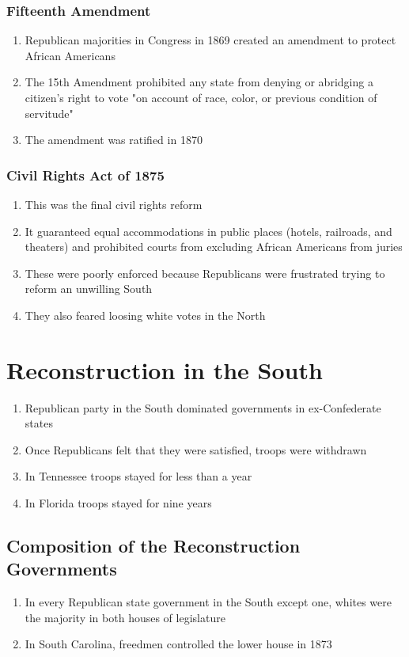 \documentclass[12pt]{article} %
\begin{document}
\subsubsection{Fifteenth Amendment}
\begin{enumerate}
	\item Republican majorities in Congress in 1869 created an amendment to protect African Americans
	\item The 15th Amendment prohibited any state from denying or abridging a citizen's right to 
		vote "on account of race, color, or previous condition of servitude"
	\item The amendment was ratified in 1870
\end{enumerate}

\subsubsection{Civil Rights Act of 1875}
\begin{enumerate}
	\item This was the final civil rights reform
	\item It guaranteed equal accommodations in public places (hotels, railroads, and theaters) and
		prohibited courts from excluding African Americans from juries
	\item These were poorly enforced because Republicans were frustrated trying to reform an unwilling
		South
	\item They also feared loosing white votes in the North
\end{enumerate}

\section{Reconstruction in the South}
\begin{enumerate}
	\item Republican party in the South dominated governments in ex-Confederate states
	\item Once Republicans felt that they were satisfied, troops were withdrawn
	\item In Tennessee troops stayed for less than a year
	\item In Florida troops stayed for nine years
\end{enumerate}

\subsection{Composition of the Reconstruction Governments}
\begin{enumerate}
	\item In every Republican state government in the South except one, whites were the majority in
		both houses of legislature
	\item In South Carolina, freedmen controlled the lower house in 1873
\end{enumerate}
\end{document}
